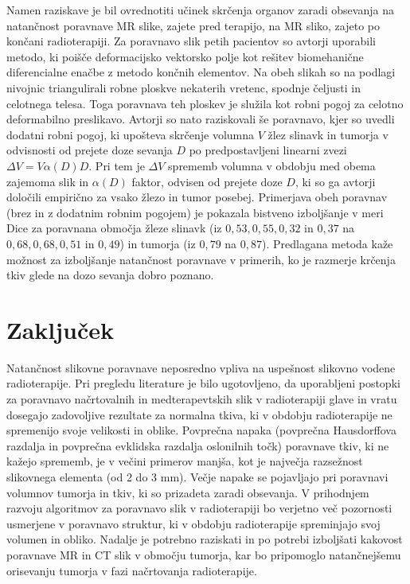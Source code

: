 \documentclass[journal]{IEEEtran}
\begin{document}
Namen raziskave \cite{al-mayah2015} je bil ovrednotiti učinek skrčenja organov zaradi obsevanja na natančnost poravnave MR slike, zajete pred terapijo, na MR sliko, zajeto po končani radioterapiji. Za poravnavo slik petih pacientov so avtorji uporabili metodo, ki poišče deformacijsko vektorsko polje kot rešitev biomehanične diferencialne enačbe z metodo končnih elementov. Na obeh slikah so na podlagi nivojnic triangulirali robne ploskve nekaterih vretenc, spodnje čeljusti in celotnega telesa. Toga poravnava teh ploskev je služila kot robni pogoj za celotno deformabilno preslikavo. Avtorji so nato raziskovali še poravnavo, kjer so uvedli dodatni robni pogoj, ki upošteva skrčenje volumna $V$ žlez slinavk in tumorja v odvisnosti od prejete doze sevanja $D$ po predpostavljeni linearni zvezi $\Delta V = V\alpha(D)D$. Pri tem je $\Delta V$ sprememb volumna v obdobju med obema zajemoma slik in $\alpha(D)$ faktor, odvisen od prejete doze $D$, ki so ga avtorji določili empirično za vsako žlezo in tumor posebej. Primerjava obeh poravnav (brez in z dodatnim robnim pogojem) je pokazala bistveno izboljšanje v meri Dice za poravnana območja žleze slinavk (iz $0{,}53, 0{,}55, 0{,}32$ in $0{,}37$ na $0{,}68, 0{,}68, 0{,}51$ in $0{,}49$) in tumorja (iz $0{,}79$ na $0{,}87$). Predlagana metoda kaže možnost za izboljšanje natančnost poravnave v primerih, ko je razmerje krčenja tkiv glede na dozo sevanja dobro poznano.

\section{Zaključek}

Natančnost slikovne poravnave neposredno vpliva na uspešnost slikovno vodene radioterapije. Pri pregledu literature je bilo ugotovljeno, da uporabljeni postopki za poravnavo načrtovalnih in medterapevtskih slik v radioterapiji glave in vratu dosegajo zadovoljive rezultate za normalna tkiva, ki v obdobju radioterapije ne spremenijo svoje velikosti in oblike. Povprečna napaka (povprečna Hausdorffova razdalja in povprečna evklidska razdalja oslonilnih točk) poravnave tkiv, ki ne kažejo sprememb, je v večini primerov manjša, kot je največja razsežnost slikovnega elementa (od 2 do 3 mm). Večje napake se pojavljajo pri poravnavi volumnov tumorja in tkiv, ki so prizadeta zaradi obsevanja. V prihodnjem razvoju algoritmov za poravnavo slik v radioterapiji bo verjetno več pozornosti usmerjene v poravnavo struktur, ki v obdobju radioterapije spreminjajo svoj volumen in obliko. Nadalje je potrebno raziskati in po potrebi izboljšati kakovost poravnave MR in CT slik v območju tumorja, kar bo pripomoglo natančnejšemu orisevanju tumorja v fazi načrtovanja radioterapije.
\end{document}
